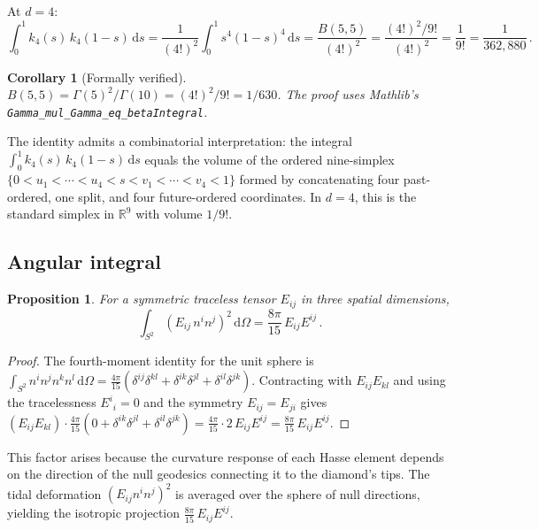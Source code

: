\documentclass[12pt,a4paper]{article}
\theoremstyle{plain}
\newtheorem{proposition}[theorem]{Proposition}
\newtheorem{corollary}[theorem]{Corollary}
\theoremstyle{definition}
\theoremstyle{remark}
\newcommand{\dd}{\mathrm{d}}
\newcommand{\Esq}{E_{ij}E^{ij}}
\begin{document}
At $d = 4$:
\begin{equation}\label{eq:beta-d4}
  \int_0^1 k_4(s)\, k_4(1-s)\,\dd s
  = \frac{1}{(4!)^2} \int_0^1 s^4(1-s)^4\,\dd s
  = \frac{B(5,5)}{(4!)^2}
  = \frac{(4!)^2/9!}{(4!)^2}
  = \frac{1}{9!}
  = \frac{1}{362{,}880}\,.
\end{equation}

\begin{corollary}[Formally verified]
\label{cor:beta55}
$B(5,5) = \Gamma(5)^2 / \Gamma(10) = (4!)^2 / 9! = 1/630$.
The proof uses Mathlib's
\texttt{Gamma\_mul\_Gamma\_eq\_betaIntegral}.
\end{corollary}

The identity admits a combinatorial interpretation: the integral
$\int_0^1 k_4(s)\,k_4(1-s)\,\dd s$ equals the volume of the
ordered nine-simplex
$\{0 < u_1 < \cdots < u_4 < s < v_1 < \cdots < v_4 < 1\}$
formed by concatenating four past-ordered, one split, and four
future-ordered coordinates.  In $d = 4$, this is the standard
simplex in $\mathbb{R}^9$ with volume $1/9!$.

\subsection{Angular integral}
\label{sec:angular}

\begin{proposition}
\label{prop:angular}
For a symmetric traceless tensor $E_{ij}$ in three spatial
dimensions,
\begin{equation}\label{eq:angular}
  \int_{S^2} (E_{ij}\, n^i n^j)^2\, \dd\Omega
  = \frac{8\pi}{15}\, \Esq\,.
\end{equation}
\end{proposition}

\begin{proof}
The fourth-moment identity for the unit sphere is
$\int_{S^2} n^i n^j n^k n^l\,\dd\Omega
= \frac{4\pi}{15}(\delta^{ij}\delta^{kl} + \delta^{ik}\delta^{jl}
+ \delta^{il}\delta^{jk})$.
Contracting with $E_{ij}E_{kl}$ and using the tracelessness
$E^i{}_i = 0$ and the symmetry $E_{ij} = E_{ji}$ gives
$(E_{ij}E_{kl}) \cdot \frac{4\pi}{15}
(0 + \delta^{ik}\delta^{jl} + \delta^{il}\delta^{jk})
= \frac{4\pi}{15} \cdot 2\, \Esq = \frac{8\pi}{15}\, \Esq$.
\end{proof}

This factor arises because the curvature response of each Hasse
element depends on the direction of the null geodesics connecting
it to the diamond's tips.  The tidal deformation
$(E_{ij} n^i n^j)^2$ is averaged over the sphere of null
directions, yielding the isotropic projection
$\frac{8\pi}{15}\, \Esq$.
\end{document}
